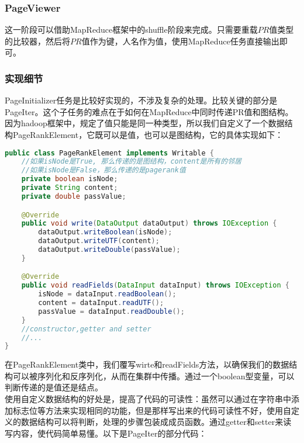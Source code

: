 \subsubsection{PageViewer}
这一阶段可以借助MapReduce框架中的shuffle阶段来完成。只需要重载$PR$值类型的比较器，然后将$PR$值作为键，人名作为值，使用MapReduce任务直接输出即可。

\subsubsection{实现细节}
PageInitializer任务是比较好实现的，不涉及复杂的处理。比较关键的部分是PageIter。这个子任务的难点在于如何在MapReduce中同时传递PR值和图结构。因为hadoop框架中，规定了值只能是同一种类型，所以我们自定义了一个数据结构PageRankElement，它既可以是值，也可以是图结构，它的具体实现如下：
\begin{lstlisting}[language=Java]
public class PageRankElement implements Writable {
	//如果isNode是True, 那么传递的是图结构，content是所有的邻居
	//如果isNode是False，那么传递的是pagerank值
	private boolean isNode;
	private String content;
	private double passValue;

	@Override
	public void write(DataOutput dataOutput) throws IOException {
		dataOutput.writeBoolean(isNode);
		dataOutput.writeUTF(content);
		dataOutput.writeDouble(passValue);
	}

	@Override
	public void readFields(DataInput dataInput) throws IOException {
		isNode = dataInput.readBoolean();
		content = dataInput.readUTF();
		passValue = dataInput.readDouble();
	}
	//constructor,getter and setter
	//...
}
\end{lstlisting}
在PageRankElement类中，我们覆写wirte和readFields方法，以确保我们的数据结构可以被序列化和反序列化，从而在集群中传播。通过一个boolean型变量，可以判断传递的是值还是结点。\\
使用自定义数据结构的好处是，提高了代码的可读性：虽然可以通过在字符串中添加标志位等方法来实现相同的功能，但是那样写出来的代码可读性不好，使用自定义的数据结构可以将判断，处理的步骤包装成成员函数。通过getter和setter来读写内容，使代码简单易懂。以下是PageIter的部分代码：\\
\newpage
